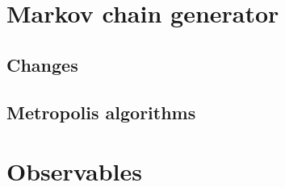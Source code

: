 \documentclass[a4paper, 12pt]{article}
\def\buildMode{buildmissing}
\begin{document}
        \clearpage
        \restoregeometry
        \recalctypearea

    \begin{landscape}
    \section{Markov chain generator}

        \subsection{Changes}
        \begin{figure}[htb]
            \centering
            
            \caption{}
        \end{figure}
        \clearpage

        \subsection{Metropolis algorithms}
        \begin{figure}[htb]
            \centering
            
            \caption{}
        \end{figure}
        \clearpage

    \section{Observables}
        \begin{figure}[htb]
            \centering
            
            \caption{}
        \end{figure}
    \end{landscape}

    \nocite{*}
    \printbibliography
\end{document}
